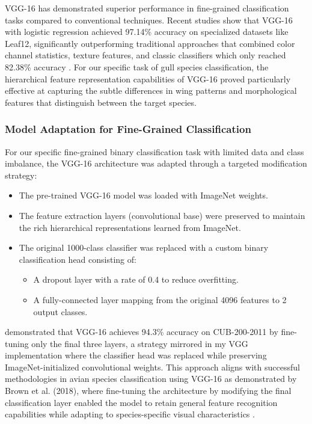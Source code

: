 \documentclass[a4paper,12pt]{report}
\begin{document}
VGG-16 has demonstrated superior performance in fine-grained classification tasks compared to conventional techniques. Recent studies show that VGG-16 with logistic regression achieved 97.14\% accuracy on specialized datasets like Leaf12, significantly outperforming traditional approaches that combined color channel statistics, texture features, and classic classifiers which only reached 82.38\% accuracy \citep{pearline2019study}. For our specific task of gull species classification, the hierarchical feature representation capabilities of VGG-16 proved particularly effective at capturing the subtle differences in wing patterns and morphological features that distinguish between the target species.

\subsubsection{Model Adaptation for Fine-Grained Classification}

For our specific fine-grained binary classification task with limited data and class imbalance, the VGG-16 architecture was adapted through a targeted modification strategy:

\begin{itemize}
    \item The pre-trained VGG-16 model was loaded with ImageNet weights.
    \item The feature extraction layers (convolutional base) were preserved to maintain the rich hierarchical representations learned from ImageNet.
    \item The original 1000-class classifier was replaced with a custom binary classification head consisting of: 
    \begin{itemize}
        \item A dropout layer with a rate of 0.4 to reduce overfitting.
        \item A fully-connected layer mapping from the original 4096 features to 2 output classes.
    \end{itemize}
\end{itemize}



\citep{zhang2019bird} demonstrated that VGG-16 achieves 94.3\% accuracy on CUB-200-2011 by fine-tuning only the final three layers, a strategy mirrored in my VGG implementation where the classifier head was replaced while preserving ImageNet-initialized convolutional weights.
This approach aligns with successful methodologies in avian species classification using VGG-16 as demonstrated by Brown et al. (2018), where fine-tuning the architecture by modifying the final classification layer enabled the model to retain general feature recognition capabilities while adapting to species-specific visual characteristics \citep{10533638}.
\end{document}
